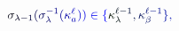 \documentclass[12pt]{article}
\begin{document}
\makeatletter
\renewcommand*{\@textcolor}[3]{%
  \protect\leavevmode
  \begingroup
    \color#1{#2}#3%
  \endgroup
}
\makeatother
\begin{displaymath}
\mathcolor[RGB]{0,0,15}{\sigma} _ { \mathcolor[RGB]{0,0,30}{\lambda} \mathcolor[RGB]{0,0,45}{-} \mathcolor[RGB]{0,0,60}{1} } \mathcolor[RGB]{0,0,75}{(} \mathcolor[RGB]{0,0,90}{\sigma} _ { \mathcolor[RGB]{0,0,105}{\lambda} } ^ { \mathcolor[RGB]{0,0,120}{-} \mathcolor[RGB]{0,0,135}{1} } \mathcolor[RGB]{0,0,150}{(} \mathcolor[RGB]{0,0,165}{\kappa} _ { \mathcolor[RGB]{0,0,180}{a} } ^ { \mathcolor[RGB]{0,0,195}{\ell} } \mathcolor[RGB]{0,0,210}{)} \mathcolor[RGB]{0,0,225}{)} \mathcolor[RGB]{0,0,240}{\in} \mathcolor[RGB]{0,0,255}{\{} \mathcolor[RGB]{0,15,0}{\kappa} _ { \mathcolor[RGB]{0,15,15}{\lambda} } ^ { \mathcolor[RGB]{0,15,30}{\ell} \mathcolor[RGB]{0,15,45}{-} \mathcolor[RGB]{0,15,60}{1} } \mathcolor[RGB]{0,15,75}{,} \mathcolor[RGB]{0,15,90}{\kappa} _ { \mathcolor[RGB]{0,15,105}{\beta} } ^ { \mathcolor[RGB]{0,15,120}{\ell} \mathcolor[RGB]{0,15,135}{-} \mathcolor[RGB]{0,15,150}{1} } \mathcolor[RGB]{0,15,165}{\}} \mathcolor[RGB]{0,15,180}{,}
\end{displaymath}
\end{document}
